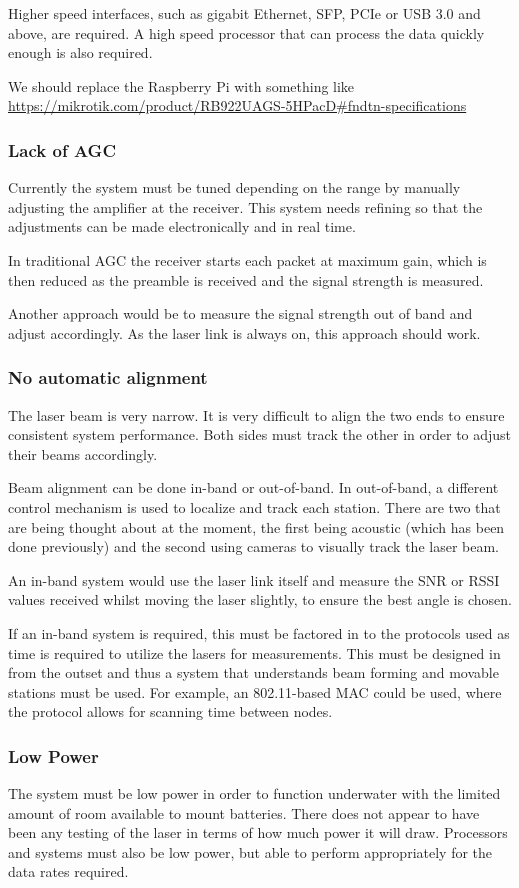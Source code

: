 Higher speed interfaces, such as gigabit Ethernet, \ac{SFP}, \ac{PCIe} or
\ac{USB} 3.0 and above, are required. A high speed processor that can process
the data quickly enough is also required.

We should replace the Raspberry Pi with something like
\url{https://mikrotik.com/product/RB922UAGS-5HPacD#fndtn-specifications}

\subsubsection{Lack of \ac{AGC}}
Currently the system must be tuned depending on the range by manually
adjusting the amplifier at the receiver. This system needs refining so that
the adjustments can be made electronically and in real time.

In traditional \ac{AGC} the receiver starts each packet at maximum gain,
which is then reduced as the preamble is received and the signal strength
is measured.

Another approach would be to measure the signal strength out of band and
adjust accordingly. As the laser link is always on, this approach should work.

\subsubsection{No automatic alignment}
The laser beam is very narrow. It is very difficult to align the two ends
to ensure consistent system performance. Both sides must track the other in
order to adjust their beams accordingly.

Beam alignment can be done in-band or out-of-band. In out-of-band, a different
control mechanism is used to localize and track each station. There are two
that are being thought about at the moment, the first being acoustic (which
has been done previously) and the second using cameras to visually track the
laser beam.

An in-band system would use the laser link itself and measure the \ac{SNR} or
\ac{RSSI} values received whilst moving the laser slightly, to ensure the best
angle is chosen.

If an in-band system is required, this must be factored in to the protocols
used as time is required to utilize the lasers for measurements. This must
be designed in from the outset and thus a system that understands beam forming
and movable stations must be used. For example, an 802.11-based \ac{MAC} could
be used, where the protocol allows for scanning time between nodes.

\subsubsection{Low Power}
The system must be low power in order to function underwater with the limited
amount of room available to mount batteries. There does not appear to have been
any testing of the laser in terms of how much power it will draw. Processors
and systems must also be low power, but able to perform appropriately for
the data rates required.
